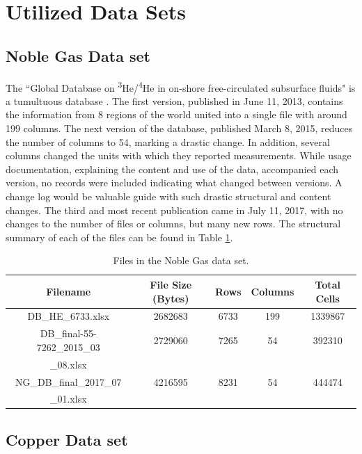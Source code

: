 \section{Utilized Data Sets}

\subsection{Noble Gas Data set}

The ``Global Database on \textsuperscript{3}He/\textsuperscript{4}He in on-shore free-circulated subsurface fluids" is a tumultuous database \cite{Polyak2015}.
The first version, published in June 11, 2013, contains the information from 8 regions of the world united into a single file with around 199 columns.
The next version of the database, published March 8, 2015, reduces the number of columns to 54, marking a drastic change.
In addition, several columns changed the units with which they reported measurements.
While usage documentation, explaining the content and use of the data, accompanied each version, no records were included indicating what changed between versions.
A change log would be valuable guide with such drastic structural and content changes.
The third and most recent publication came in July 11, 2017, with no changes to the number of files or columns, but many new rows.
The structural summary of each of the files can be found in Table \ref{noble_gas_file_table}.

\begin{table}
	\caption{Files in the Noble Gas data set.}
	\label{noble_gas_file_table}
	\centering
	\begin{tabular}{|c|c|c|c|c|}
		\hline
		Filename & File Size (Bytes) & Rows & Columns &	Total Cells \\ \hline
		DB\_HE\_6733.xlsx &	2682683 &	6733 &	199 &	1339867 \\
		DB\_final-55-7262\_2015\_03 &	2729060 &	7265 &	54 &	392310 \\
		\_08.xlsx&&&&\\
		NG\_DB\_final\_2017\_07 &	4216595 &	8231 &	54 &	444474 \\
		\_01.xlsx&&&&\\
		\hline
	\end{tabular}
\end{table}

\subsection{Copper Data set}

